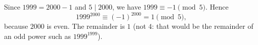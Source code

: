 Since $1999=2000-1$ and $5\mid2000$, we have $1999\equiv-1\pmod5$. Hence
\[1999^{2000}\equiv(-1)^{2000}=1\pmod5,\]
because $2000$ is even. The remainder is $\boxed{1}$ (not $4$: that would be the remainder of an odd power such as $1999^{1999}$).
